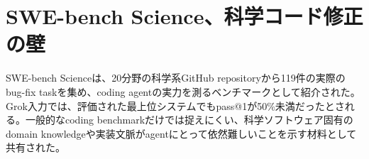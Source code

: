 \section{SWE-bench Science、科学コード修正の壁}
SWE-bench Scienceは、20分野の科学系GitHub repositoryから119件の実際のbug-fix taskを集め、coding agentの実力を測るベンチマークとして紹介された。Grok入力では、評価された最上位システムでもpass@1が50\%未満だったとされる。一般的なcoding benchmarkだけでは捉えにくい、科学ソフトウェア固有のdomain knowledgeや実装文脈がagentにとって依然難しいことを示す材料として共有された。
